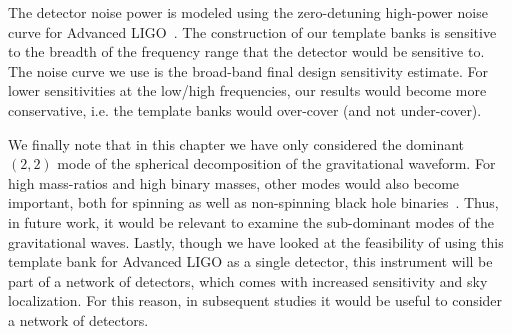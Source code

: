 The detector noise power is modeled using the zero-detuning high-power 
noise curve for Advanced LIGO~\cite{aLIGONoiseCurve}.
The construction of our template banks is sensitive to the breadth
of the frequency range that the detector would be 
sensitive to. The noise curve we use is the broad-band final design 
sensitivity estimate. For lower sensitivities
at the low/high frequencies, our results would become more conservative, 
i.e. the template banks would over-cover (and not under-cover).

We finally note that in this chapter we have only considered the
dominant $(2,2)$ mode of the spherical decomposition of the 
gravitational waveform. For high mass-ratios and high binary masses,
other modes would also become important, both for spinning as well
as non-spinning black hole binaries~\cite{Pekowsky:2012sr,
Brown:2012nn,Capano:2013inPrep}.
Thus, in future work, it would be relevant to examine the
sub-dominant modes of the gravitational waves. Lastly, though we have
looked at the feasibility of using this template bank for Advanced
LIGO as a single detector, this instrument will be part of a network
of detectors, which comes with increased sensitivity and sky
localization. For this reason, in subsequent studies it would be
useful to consider a network of detectors.
